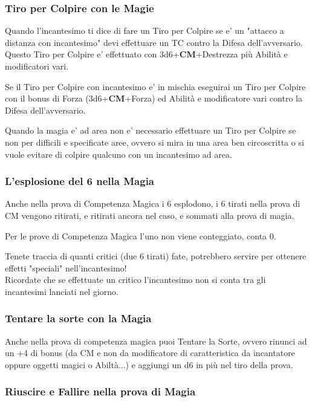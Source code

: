 \begin{multicols}{2}
\subsubsection{Tiro per Colpire con le Magie}

Quando l'incantesimo ti dice di fare un Tiro per Colpire se e' un "attacco a distanza con incantesimo" devi effettuare un TC contro la Difesa dell'avversario. Questo Tiro per Colpire e' effettuato con 3d6+\textbf{CM}+Destrezza più Abilità e modificatori vari.

Se il Tiro per Colpire con incantesimo e' in mischia eseguirai un Tiro per Colpire con il bonus di Forza (3d6+\textbf{CM}+Forza) ed Abilità e modificatore vari contro la Difesa dell'avversario.

Quando la magia e' ad area non e' necessario effettuare un Tiro per Colpire se non per difficili e specificate aree, ovvero si mira in una area ben circoscritta o si vuole evitare di colpire qualcuno con un incantesimo ad area.

\subsubsection{L'esplosione del 6 nella Magia}

Anche nella prova di Competenza Magica i 6 esplodono, i 6 tirati nella prova di CM vengono ritirati, e ritirati ancora nel caso, e sommati alla prova di magia.

Per le prove di Competenza Magica l'uno non viene conteggiato, conta 0.

Tenete traccia di quanti critici (due 6 tirati) fate, potrebbero servire per ottenere effetti "speciali" nell'incantesimo!\\
Ricordate che se effettuate un critico l'incantesimo non si conta tra gli incantesimi lanciati nel giorno.

\subsubsection{Tentare la sorte con la Magia}

Anche nella prova di competenza magica puoi Tentare la Sorte, ovvero rinunci ad un +4 di bonus (da CM e non da  modificatore di caratteristica da incantatore oppure oggetti magici o Abiltà...) e aggiungi un d6 in più nel tiro della prova.

\subsubsection{Riuscire e Fallire nella prova di Magia}


\end{multicols}
